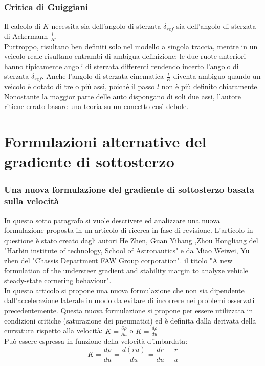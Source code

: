 \subsubsection{Critica di Guiggiani}
Il calcolo di $K$ necessita sia dell'angolo di sterzata $\delta_{ref}$ sia dell'angolo di sterzata di
Ackermann $\frac{l}{R}$.\\ 
Purtroppo, risultano ben definiti solo nel modello a singola traccia, mentre in un veicolo reale
risultano entrambi di ambigua definizione: le due ruote anteriori hanno tipicamente
angoli di sterzata differenti rendendo incerto l'angolo di sterzata $\delta_{ref}$.
Anche l'angolo di sterzata cinematica $\frac{l}{R}$ diventa ambiguo quando un veicolo è dotato
di tre o più assi, poiché il passo $l$ non è più definito chiaramente. Nonostante la maggior parte
delle auto dispongano di soli due assi, l'autore ritiene errato basare una teoria su un concetto
così debole.\\


\section{Formulazioni alternative del gradiente di sottosterzo}
\subsubsection{Una nuova formulazione del gradiente di sottosterzo basata sulla velocità}
In questo sotto paragrafo si vuole descrivere ed analizzare una nuova formulazione proposta in un 
articolo di ricerca in fase di revisione.
L'articolo in questione è stato creato dagli autori He Zhen, Guan Yihang ,Zhou Hongliang del "Harbin 
institute of technology, School of Astronautics" e da Miao Weiwei, Yu zhen del "Chassis Department
FAW Group corporation".
il titolo "A new formulation of the understeer gradient and stability
margin to analyze vehicle steady-state cornering behaviour".\\

In questo articolo si propone una nuova formulazione che non sia dipendente dall'accelerazione
laterale in modo da evitare di incorrere nei problemi osservati precedentemente.
Questa nuova formulazione si propone per essere utilizzata in condizioni critiche 
(saturazione dei pneumatici) ed è definita dalla derivata della curvatura rispetto alla velocità: 
$K = \frac{\partial \rho}{\partial u}$ o $K = \frac{d \rho} {du}$\\ 
Può essere espressa in funzione della velocità d'imbardata:
\begin{equation} \label{Kcinesi}
K = \frac{d \rho}{du} = \frac{d(ru)}{du} = \frac{dr}{du} - \frac{r}{u}
\end{equation}

